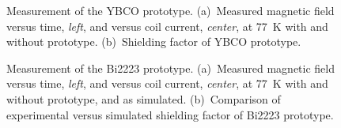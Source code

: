 \begin{refsection}
        \begin{figure}
            \centering
            \hfill
            \caption{Measurement of the YBCO prototype. (a)~Measured magnetic field versus time, {\it left}, and versus coil current, {\it center}, at \SI{77}{K} with and without prototype. (b)~Shielding factor of YBCO prototype.}
        \label{fig:YBCO}
        \end{figure}
        
        \begin{figure}
            \centering
            \hfill
            \caption{Measurement of the Bi2223 prototype. (a)~Measured magnetic field versus time, {\it left}, and versus coil current, {\it center}, at \SI{77}{K} with and without prototype, and as simulated. (b)~Comparison of experimental versus simulated shielding factor of Bi2223 prototype.}
        \label{fig:Bi2223}
        \end{figure}


\end{refsection}
